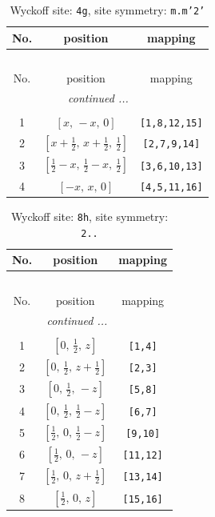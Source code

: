 \documentclass[fleqn,8pt]{jsarticle}
\begin{document}
\renewcommand{\arraystretch}{1.2}
\begin{longtable}{ccc}
\caption{Wyckoff site: {\tt 4g}, site symmetry: {\tt m.m'2'}}
 \\
 \hline \hline
No. & position & mapping \\ \hline \endfirsthead

\multicolumn{2}{l}{\tablename\ \thetable{}} \\
 \hline \hline
No. & position & mapping \\ \hline \endhead

 \hline \hline
\multicolumn{2}{r}{\footnotesize\it continued ...} \\ \endfoot

 \hline \hline
\multicolumn{2}{r}{} \\ \endlastfoot

1 & $\left[ x,\, - x,\, 0 \right]$ & {\tt [1,8,12,15]} \\ \hline
2 & $\left[ x + \frac{1}{2},\, x + \frac{1}{2},\, \frac{1}{2} \right]$ & {\tt [2,7,9,14]} \\ \hline
3 & $\left[ \frac{1}{2} - x,\, \frac{1}{2} - x,\, \frac{1}{2} \right]$ & {\tt [3,6,10,13]} \\ \hline
4 & $\left[ - x,\, x,\, 0 \right]$ & {\tt [4,5,11,16]} \\
\end{longtable}
\renewcommand{\arraystretch}{1.2}
\begin{longtable}{ccc}
\caption{Wyckoff site: {\tt 8h}, site symmetry: {\tt 2..}}
 \\
 \hline \hline
No. & position & mapping \\ \hline \endfirsthead

\multicolumn{2}{l}{\tablename\ \thetable{}} \\
 \hline \hline
No. & position & mapping \\ \hline \endhead

 \hline \hline
\multicolumn{2}{r}{\footnotesize\it continued ...} \\ \endfoot

 \hline \hline
\multicolumn{2}{r}{} \\ \endlastfoot

1 & $\left[ 0,\, \frac{1}{2},\, z \right]$ & {\tt [1,4]} \\ \hline
2 & $\left[ 0,\, \frac{1}{2},\, z + \frac{1}{2} \right]$ & {\tt [2,3]} \\ \hline
3 & $\left[ 0,\, \frac{1}{2},\, - z \right]$ & {\tt [5,8]} \\ \hline
4 & $\left[ 0,\, \frac{1}{2},\, \frac{1}{2} - z \right]$ & {\tt [6,7]} \\ \hline
5 & $\left[ \frac{1}{2},\, 0,\, \frac{1}{2} - z \right]$ & {\tt [9,10]} \\ \hline
6 & $\left[ \frac{1}{2},\, 0,\, - z \right]$ & {\tt [11,12]} \\ \hline
7 & $\left[ \frac{1}{2},\, 0,\, z + \frac{1}{2} \right]$ & {\tt [13,14]} \\ \hline
8 & $\left[ \frac{1}{2},\, 0,\, z \right]$ & {\tt [15,16]} \\
\end{longtable}
\end{document}

